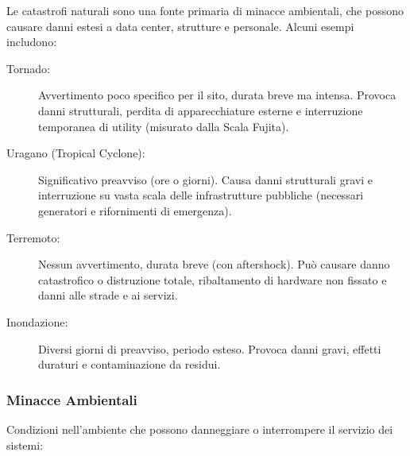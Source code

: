 Le catastrofi naturali sono una fonte primaria di minacce ambientali, che possono causare danni estesi a data center, strutture e personale. Alcuni esempi includono:

\begin{description}
    \item[Tornado:] Avvertimento poco specifico per il sito, durata breve ma intensa. Provoca danni strutturali, perdita di apparecchiature esterne e interruzione temporanea di utility (misurato dalla Scala Fujita).
    \item[Uragano (Tropical Cyclone):] Significativo preavviso (ore o giorni). Causa danni strutturali gravi e interruzione su vasta scala delle infrastrutture pubbliche (necessari generatori e rifornimenti di emergenza).
    \item[Terremoto:] Nessun avvertimento, durata breve (con aftershock). Può causare danno catastrofico o distruzione totale, ribaltamento di hardware non fissato e danni alle strade e ai servizi.
    \item[Inondazione:] Diversi giorni di preavviso, periodo esteso. Provoca danni gravi, effetti duraturi e contaminazione da residui.
\end{description}

\subsubsection{Minacce Ambientali}
Condizioni nell'ambiente che possono danneggiare o interrompere il servizio dei sistemi:

